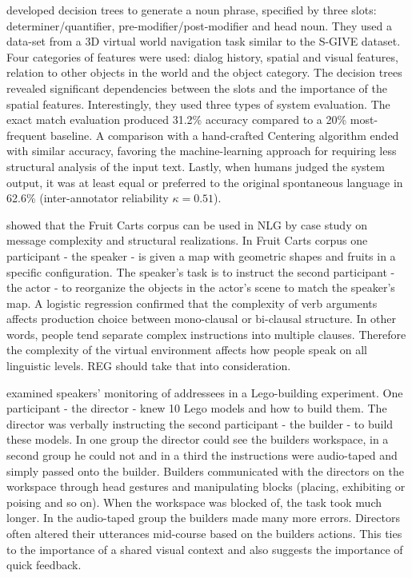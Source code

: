 \citet{stoia2006noun} developed decision trees to generate a noun phrase, specified by three slots: determiner/quantifier, pre-modifier/post-modifier and head noun. They used a data-set from a 3D virtual world navigation task similar to the S-GIVE dataset. Four categories of features were used: dialog history, spatial and visual features, relation to other objects in the world and the object category. The decision trees revealed significant dependencies between the slots and the importance of the spatial features. Interestingly, they used three types of system evaluation. The exact match evaluation produced 31.2\% accuracy compared to a 20\% most-frequent baseline. A comparison with a hand-crafted Centering algorithm \citep{kibble2000integrated} ended with similar accuracy, favoring the machine-learning approach for requiring less structural analysis of the input text. Lastly, when humans judged the system output, it was at least equal or preferred to the original spontaneous language in 62.6\% (inter-annotator reliability $\kappa = 0.51$).

\citet{gallo2008production} showed that the Fruit Carts corpus can be used in NLG by case study on message complexity and structural realizations. In Fruit Carts corpus one participant - the speaker - is given a map with geometric shapes and fruits in a specific configuration. The speaker's task is to instruct the second participant - the actor - to reorganize the objects in the actor's scene to match the speaker's map. A logistic regression confirmed that the complexity of verb arguments affects production choice between mono-clausal or bi-clausal structure. In other words, people tend separate complex instructions into multiple clauses. Therefore the complexity of the virtual environment affects how people speak on all linguistic levels. REG should take that into consideration.

\citet{clark2004speaking} examined speakers' monitoring of addressees in a Lego-building experiment. One participant - the director - knew 10 Lego models and how to build them. The director was verbally instructing the second participant - the builder - to build these models. In one group the director could see the builders workspace, in a second group he could not and in a third the instructions were audio-taped and simply passed onto the builder. Builders communicated with the directors on the workspace through head gestures and manipulating blocks (placing, exhibiting or poising and so on). When the workspace was blocked of, the task took much longer. In the audio-taped group the builders made many more errors. Directors often altered their utterances mid-course based on the builders actions. This ties to the importance of a shared visual context and also suggests the importance of quick feedback. 

